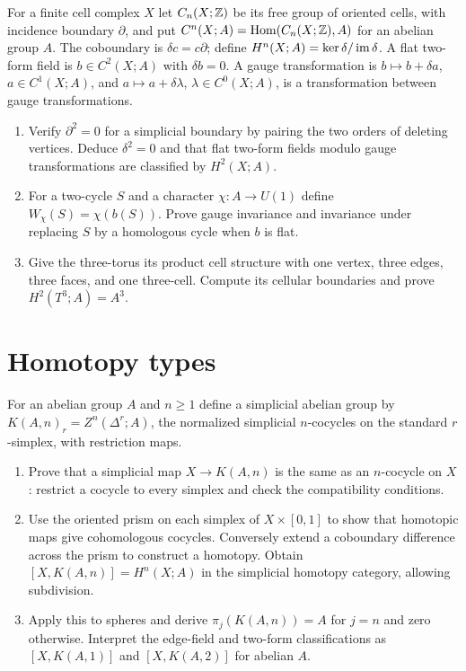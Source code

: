 \begin{exercise}
For a finite cell complex $X$ let $C_n(X;\mathbb Z)$ be its free group of
oriented cells, with incidence boundary $\partial$, and put
$C^n(X;A)=\operatorname{Hom}(C_n(X;\mathbb Z),A)$ for an abelian group $A$.
The coboundary is $\delta c=c\partial$; define
$H^n(X;A)=\ker\delta/\operatorname{im}\delta$.
A flat two-form field is $b\in C^2(X;A)$ with $\delta b=0$.
A gauge transformation is $b\mapsto b+\delta a$, $a\in C^1(X;A)$,
and $a\mapsto a+\delta\lambda$, $\lambda\in C^0(X;A)$,
is a transformation between gauge transformations.
\begin{enumerate}[label=(\alph*)]
\item Verify $\partial^2=0$ for a simplicial boundary by pairing
the two orders of deleting vertices. Deduce $\delta^2=0$ and
that flat two-form fields modulo gauge transformations are
classified by $H^2(X;A)$.
\item For a two-cycle $S$ and a character $\chi:A\to U(1)$ define
$W_\chi(S)=\chi(b(S))$. Prove gauge invariance and invariance
under replacing $S$ by a homologous cycle when $b$ is flat.
\item Give the three-torus its product cell structure with one
vertex, three edges, three faces, and one three-cell.
Compute its cellular boundaries and prove
$H^2(T^3;A)=A^3$.
\end{enumerate}
\end{exercise}

\section{Homotopy types}

\begin{exercise}
For an abelian group $A$ and $n\ge1$ define a simplicial abelian
group by
$K(A,n)_r=Z^n(\Delta^r;A)$, the normalized simplicial
$n$-cocycles on the standard $r$-simplex, with restriction maps.
\begin{enumerate}[label=(\alph*)]
\item Prove that a simplicial map $X\to K(A,n)$ is the same
as an $n$-cocycle on $X$: restrict a cocycle to every simplex
and check the compatibility conditions.
\item Use the oriented prism on each simplex of $X\times[0,1]$
to show that homotopic maps give cohomologous cocycles.
Conversely extend a coboundary difference across the prism to
construct a homotopy. Obtain $[X,K(A,n)]=H^n(X;A)$ in
the simplicial homotopy category, allowing subdivision.
\item Apply this to spheres and derive
$\pi_j(K(A,n))=A$ for $j=n$ and zero otherwise.
Interpret the edge-field and two-form classifications as
$[X,K(A,1)]$ and $[X,K(A,2)]$ for abelian $A$.
\end{enumerate}
\end{exercise}


